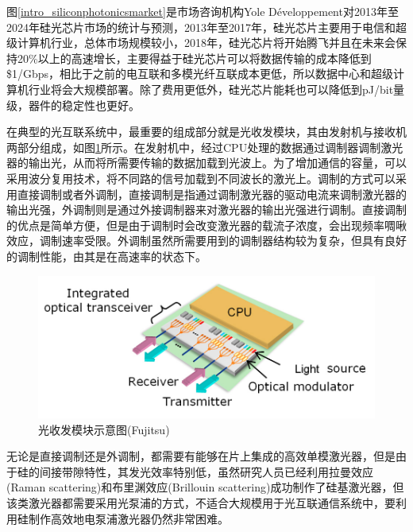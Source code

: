 图\ref{intro_siliconphotonicsmarket}是市场咨询机构Yole Développement对2013年至2024年硅光芯片市场的统计与预测，2013年至2017年，硅光芯片主要用于电信和超级计算机行业，总体市场规模较小，2018年，硅光芯片将开始腾飞并且在未来会保持20\%以上的高速增长，主要得益于硅光芯片可以将数据传输的成本降低到\$1/Gbps，相比于之前的电互联和多模光纤互联成本更低，所以数据中心和超级计算机行业将会大规模部署。除了费用更低外，硅光芯片能耗也可以降低到pJ/bit量级，器件的稳定性也更好。

在典型的光互联系统中，最重要的组成部分就是光收发模块，其由发射机与接收机两部分组成，如图\ref{intro_transceiver}所示。在发射机中，经过CPU处理的数据通过调制器调制激光器的输出光，从而将所需要传输的数据加载到光波上。为了增加通信的容量，可以采用波分复用技术，将不同路的信号加载到不同波长的激光上。调制的方式可以采用直接调制或者外调制，直接调制是指通过调制激光器的驱动电流来调制激光器的输出光强，外调制则是通过外接调制器来对激光器的输出光强进行调制。直接调制的优点是简单方便，但是由于调制时会改变激光器的载流子浓度，会出现频率啁啾效应，调制速率受限。外调制虽然所需要用到的调制器结构较为复杂，但具有良好的调制性能，由其是在高速率的状态下。

\begin{figure}[htb]
	\centering
	\includegraphics[width=14cm]{./Pictures/intro_transceiver.jpg}
	\captionsetup{justification=centering}
	\caption{光收发模块示意图(Fujitsu)}
	\label{intro_transceiver}
\end{figure}

无论是直接调制还是外调制，都需要有能够在片上集成的高效单模激光器，但是由于硅的间接带隙特性，其发光效率特别低，虽然研究人员已经利用拉曼效应(Raman scattering)和布里渊效应(Brillouin scattering)成功制作了硅基激光器\cite{otterstrom2018silicon,rong2007low}，但该类激光器都需要采用光泵浦的方式，不适合大规模用于光互联通信系统中，要利用硅制作高效地电泵浦激光器仍然非常困难。

